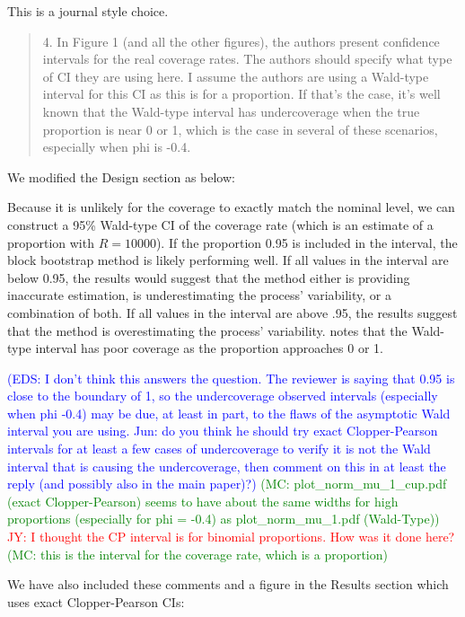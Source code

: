 \documentclass[12pt]{article}
\newcommand{\jy}[1]{\textcolor{red}{JY: #1}}
\newcommand{\eds}[1]{\textcolor{blue}{(EDS: #1)}}
\newcommand{\mc}[1]{\textcolor{green}{(MC: #1)}}
\newenvironment{comment}%
{\begin{quotation}\noindent\small\it\color{darkblue}\ignorespaces%
}{\end{quotation}}
\begin{document}
This is a journal style choice.

\begin{comment}
4.  In Figure 1 (and all the other figures), the authors present confidence 
intervals for the real coverage rates.  The authors should specify what type of 
CI they are using here.  I assume the authors are using a Wald-type interval for 
this CI as this is for a proportion.  If that’s the case, it’s well known that 
the Wald-type interval has undercoverage when the true proportion is near 0 or 
1, which is the case in several of these scenarios, especially when phi is -0.4. 
\end{comment}

We modified the Design section as below:

Because it is unlikely for the coverage to 
exactly match the nominal level, we can construct a 95\% Wald-type CI of the 
coverage rate 
(which is an estimate of a proportion with $R = 10000$). If the proportion 0.95 
is included in the interval, the block bootstrap method is likely performing 
well. If all values in the interval are below 0.95, the results would suggest 
that the method either is providing inaccurate estimation, is underestimating 
the process' variability, or a combination of both. If all values in the 
interval are above .95, the results suggest that the method is overestimating 
the process' variability. \citet{brown2001interval} notes that the Wald-type 
interval has poor coverage as the proportion approaches 0 or 1.

\eds{I don't think this answers the question.  The reviewer is saying that 0.95 
is close to the boundary of 1, so the undercoverage observed intervals
(especially when phi -0.4) may be due, at least in part, to the flaws 
of the asymptotic Wald interval you are using. 
\@ Jun: do you think he should try exact Clopper-Pearson
intervals for at least a few cases of undercoverage to verify it is not the Wald
interval that is causing the undercoverage, then comment on this in at least the
reply (and possibly also in the main paper)?}
\mc{plot\_norm\_mu\_1\_cup.pdf (exact Clopper-Pearson) seems to have about the same 
widths for high 
proportions
(especially for phi = -0.4) as {plot\_norm\_mu\_1.pdf} (Wald-Type)}
\jy{I thought the CP interval is for binomial proportions. How was it
  done here?}
\mc{this is the interval for the coverage rate, which is a proportion}


We have also included these comments and a figure in the Results section which 
uses exact 
Clopper-Pearson CIs:
\end{document}

